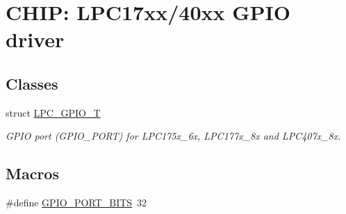 \hypertarget{group__GPIO__17XX__40XX}{}\section{C\+H\+IP\+: L\+P\+C17xx/40xx G\+P\+IO driver}
\label{group__GPIO__17XX__40XX}
\subsection*{Classes}
\begin{DoxyCompactItemize}
\item 
struct \hyperlink{structLPC__GPIO__T}{L\+P\+C\+\_\+\+G\+P\+I\+O\+\_\+T}
\begin{DoxyCompactList}\small\item\em G\+P\+IO port (G\+P\+I\+O\+\_\+\+P\+O\+RT) for L\+P\+C175x\+\_\+6x, L\+P\+C177x\+\_\+8x and L\+P\+C407x\+\_\+8x. \end{DoxyCompactList}\end{DoxyCompactItemize}
\subsection*{Macros}
\begin{DoxyCompactItemize}
\item 
\#define \hyperlink{group__GPIO__17XX__40XX_gab4525a5821aedad3e12d4fcdfb760c69}{G\+P\+I\+O\+\_\+\+P\+O\+R\+T\+\_\+\+B\+I\+TS}~32
\end{DoxyCompactItemize}
